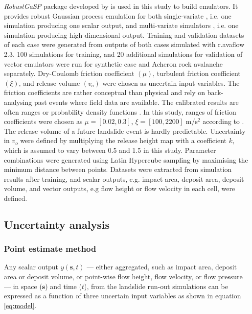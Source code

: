 \documentclass[utf8]{FrontiersinHarvard}
\begin{document}
\textit{RobustGaSP} package developed by \citet{Gu2019} is used in this study to build emulators. It provides robust Gaussian process emulation for both single-variate \citep{Gu2018}, i.e. one simulation producing one scalar output, and multi-variate simulators \citep{Gu2016}, i.e. one simulation producing high-dimensional output. Training and validation datasets of each case were generated from outputs of both cases simulated with r.avaflow 2.3. 100 simulations for training, and 20 additional simulations for validation of vector emulators were run for synthetic case and Acheron rock avalanche separately. Dry-Coulomb friction coefficient $\left ( \mu \right )$, turbulent friction coefficient $\left ( \xi \right )$, and release volume $\left ( v_o \right )$ were chosen as uncertain input variables. The friction coefficients are rather conceptual than physical \citep{Fischer2015} and rely on back-analysing past events where field data are available. The calibrated results are often ranges \citep{Zhao2021} or probability density functions \citep{Quan2013}. In this study, ranges of friction coefficients were chosen as $\mu = [0.02, 0.3]$, $\xi = [100, 2200]$ m/s$^2$ according to \citet{Zhao2021}. The release volume of a future landslide event is hardly predictable. Uncertainty in $v_o$ were defined by multiplying the release height map with a coefficient $k$, which is assumed to vary between 0.5 and 1.5 in this study. Parameter combinations were generated using Latin Hypercube sampling by maximising the minimum distance between points. Datasets were extracted from simulation results after training, and scalar outputs, e.g. impact area, deposit area, deposit volume, and vector outputs, e.g flow height or flow velocity in each cell, were defined.

\subsection{Uncertainty analysis}
\label{sec:uncertainty}

\subsubsection{Point estimate method}
\label{sec:method_pem}

Any scalar output $y(\mathbf{s},t)$ --- either aggregated, such as impact area, deposit area or deposit volume, or point-wise flow height, flow velocity, or flow pressure --- in space ($\mathbf{s}$) and time ($t$), from the landslide run-out simulations can be expressed as a function of three uncertain input variables as shown in equation \ref{eq:model}.
\end{document}
